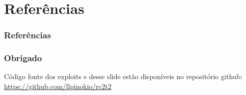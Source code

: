 \documentclass{beamer}
\begin{document}
\section{Referências}
\begin{frame}
	\frametitle{Referências}
	
	
	\nocite{*}
\end{frame}

\begin{frame}
	\frametitle{Obrigado}
	Código fonte dos exploits e desse slide estão disponíveis no repositório github:\\ \url{https://github.com/llpinokio/rc2t2}
\end{frame}
\end{document}
